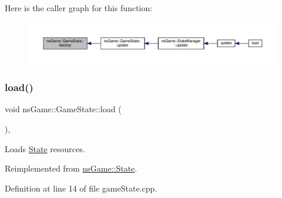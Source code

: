 Here is the caller graph for this function\+:\nopagebreak
\begin{figure}[H]
\begin{center}
\leavevmode
\includegraphics[width=350pt]{classns_game_1_1_game_state_ac0fdc8e463ca2e79a0fb58e12e5b39c9_icgraph}
\end{center}
\end{figure}
\mbox{\label{classns_game_1_1_game_state_a66f7b8027a33f473fd22c212700586f2}} 
\subsubsection{\texorpdfstring{load()}{load()}}
{\footnotesize\ttfamily void ns\+Game\+::\+Game\+State\+::load (\begin{DoxyParamCaption}{ }\end{DoxyParamCaption})\hspace{0.3cm}{\ttfamily [override]}, {\ttfamily [virtual]}}



Loads \hyperlink{structns_game_1_1_state}{State} resources. 



Reimplemented from \hyperlink{structns_game_1_1_state_a8644de505f7a84933f6d6e6651205791}{ns\+Game\+::\+State}.



Definition at line 14 of file game\+State.\+cpp.

